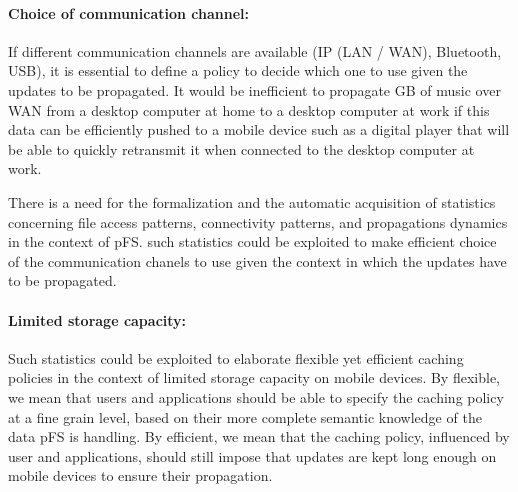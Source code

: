 %

\paragraph {Choice of communication channel:}
If different communication channels are available (IP (LAN / WAN),
Bluetooth, USB), it is essential to define a policy to decide which
one to use given the updates to be propagated. It would be inefficient
to propagate GB of music over WAN from a desktop computer at home to a
desktop computer at work if this data can be efficiently pushed to a
mobile device such as a digital player that will be able to quickly
retransmit it when connected to the desktop computer at work. 

There is a need for the formalization and the automatic acquisition of
statistics concerning file access patterns, connectivity patterns, and
propagations dynamics in the context of pFS. such statistics could be
exploited to make efficient choice of the communication chanels to
use given the context in which the updates have to be propagated.

\paragraph {Limited storage capacity:}
Such statistics could be exploited to elaborate flexible yet efficient
caching policies in the context of limited storage capacity on mobile
devices. By flexible, we mean that users and applications should be
able to specify the caching policy at a fine grain level, based on
their more complete semantic knowledge of the data pFS is handling. By
efficient, we mean that the caching policy, influenced by user and
applications, should still impose that updates are kept long enough on
mobile devices to ensure their propagation.

